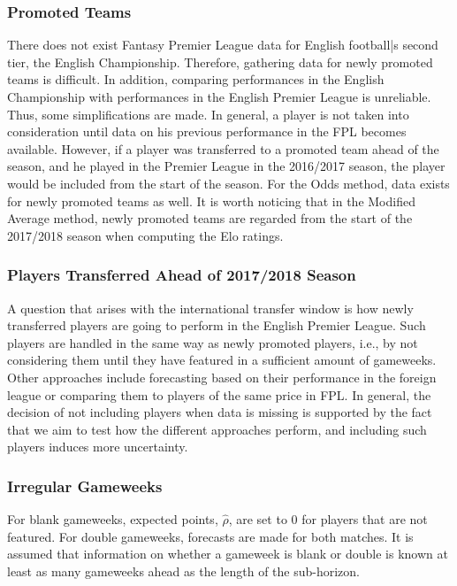 \subsubsection{Promoted Teams}

There does not exist Fantasy Premier League data for English football|s second tier, the English Championship. Therefore, gathering data for newly promoted teams is difficult. In addition, comparing performances in the English Championship with performances in the English Premier League is unreliable. Thus, some simplifications are made. In general, a player is not taken into consideration until data on his previous performance in the FPL becomes available. However, if a player was transferred to a promoted team ahead of the season, and he played in the Premier League in the 2016/2017 season, the player would be included from the start of the season. For the Odds method, data exists for newly promoted teams as well. It is worth noticing that in the Modified Average method, newly promoted teams are regarded from the start of the 2017/2018 season when computing the Elo ratings. 

\subsubsection{Players Transferred Ahead of 2017/2018 Season}
A question that arises with the international transfer window is how newly transferred players are going to perform in the English Premier League. Such players are handled in the same way as newly promoted players, i.e., by not considering them until they have featured in a sufficient amount of gameweeks. Other approaches include forecasting based on their performance in the foreign league or comparing them to players of the same price in FPL. In general, the decision of not including players when data is missing is supported by the fact that we aim to test how the different approaches perform, and including such players induces more uncertainty.

\subsubsection{Irregular Gameweeks}

For blank gameweeks, expected points, $\hat{\rho}$, are set to 0 for players that are not featured. For double gameweeks, forecasts are made for both matches. It is assumed that information on whether a gameweek is blank or double is known at least as many gameweeks ahead as the length of the sub-horizon.


